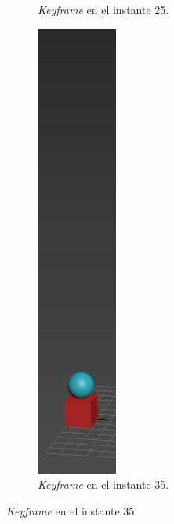 \documentclass{article}
\begin{document}
\begin{figure}[H]
\begin{subfigure}[H]{0.15\textwidth}
	    \caption{\textit{Keyframe} en el instante 25.}
	\end{subfigure}
    \hfill
	\begin{subfigure}[H]{0.15\textwidth}
	    \centering
	    \includegraphics[width=\textwidth]{imagenes/Ejercicio 1/p1_ins15.png}
	    \caption{\textit{Keyframe} en el instante 35.}
	\end{subfigure}
\end{figure}
\end{document}
